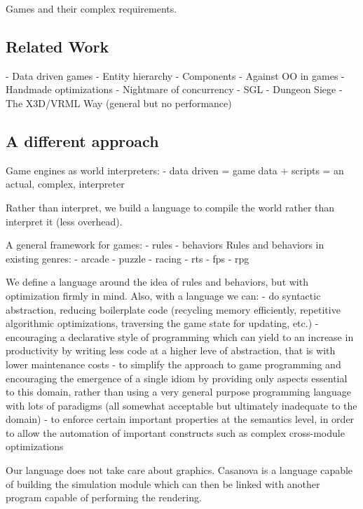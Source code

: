 
Games and their complex requirements.

\subsection{Related Work}
- Data driven games
- Entity hierarchy
- Components
- Against OO in games
- Handmade optimizations
- Nightmare of concurrency
- SGL
- Dungeon Siege
- The X3D/VRML Way (general but no performance)

\subsection{A different approach}

Game engines as world interpreters:
- data driven = game data + scripts = an actual, complex, interpreter

Rather than interpret, we build a language to compile the world rather than interpret it (less overhead).

A general framework for games:
- rules
- behaviors
Rules and behaviors in existing genres:
- arcade
- puzzle
- racing
- rts
- fps
- rpg

We define a language around the idea of rules and behaviors, but with optimization firmly in mind.
Also, with a language we can:
- do syntactic abstraction, reducing boilerplate code (recycling memory efficiently, repetitive algorithmic optimizations, traversing the game state for updating, etc.)
- encouraging a declarative style of programming which can yield to an increase in productivity by writing less code at a higher leve of abstraction, that is with lower maintenance costs
- to simplify the approach to game programming and encouraging the emergence of a single idiom by providing only aspects essential to this domain, rather than using a very general purpose programming language with lots of paradigms (all somewhat acceptable but ultimately inadequate to the domain)
- to enforce certain important properties at the semantics level, in order to allow the automation of important constructs such as complex cross-module optimizations

Our language does not take care about graphics. Casanova is a language capable of building the simulation module which can then be linked with another program capable of performing the rendering.